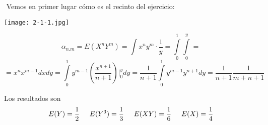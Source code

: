\documentclass[openany]{book}
\begin{document}
\begin{exercise}
    $  $
    Vemos en primer lugar cómo es el recinto del ejercicio:
    \begin{center}
        \texttt{[image: 2-1-1.jpg]}
        
    \end{center}
    
    $$ \alpha_{n.m} = E(X^{n}Y^{m}) = \int\limits_{}^{}x^{n}y^{m} \cdot  \dfrac{1}{y} = \int\limits_{0}^{1}\int\limits_{0}^{y} = $$  
    $$= x^{n}x^{m-1}dxdy = \int\limits_{0}^{1} y ^{m-1} \left( \dfrac{x^{n+1}}{n+1} \right) \Biggr|_{0}^{y} dy = \dfrac{1}{n+1} \int\limits_{0}^{1} y^{m-1}y^{n+1}dy = \dfrac{1}{n+1} \dfrac{1}{m+n+1} $$

    Los resultados son
    $$ E(Y) = \dfrac{1}{2} \hspace{5mm} E(Y^3) = \dfrac{1}{3} \hspace{5mm} E(XY) = \dfrac{1}{6} \hspace{5mm} E(X) = \dfrac{1}{4} $$
    
\end{exercise}
\end{document}
